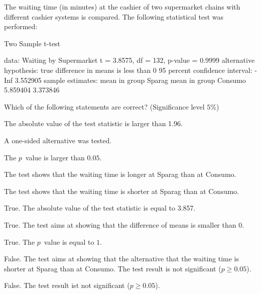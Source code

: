 
\begin{question}
The waiting time (in minutes) at the cashier of two supermarket
chains with different cashier systems is compared. The following
statistical test was performed:

\begin{Schunk}
\begin{Soutput}
	Two Sample t-test

data:  Waiting by Supermarket
t = 3.8575, df = 132, p-value = 0.9999
alternative hypothesis: true difference in means is less than 0
95 percent confidence interval:
     -Inf 3.552905
sample estimates:
 mean in group Sparag mean in group Consumo 
             5.859404              3.373846 
\end{Soutput}
\end{Schunk}

Which of the following statements are correct? (Significance level $5\%$)

\begin{answerlist}
  \item The absolute value of the test statistic is larger than 1.96.
  \item A one-sided alternative was tested.
  \item The $p$~value is larger than $0.05$.
  \item The test shows that the waiting time is longer at Sparag  than at Consumo.
  \item The test shows that the waiting time is shorter at Sparag than at Consumo.
\end{answerlist}
\end{question}

\begin{solution}
\begin{answerlist}
  \item True. The absolute value of the test statistic is equal to 3.857.
  \item True. The test aims at showing that the difference of means is  smaller than $0$.
  \item True. The $p$~value is equal to $1$.
  \item False. The test aims at showing that the alternative that the waiting time is shorter at Sparag than at Consumo. The test result is not significant ($p \ge 0.05$).
  \item False.  The test result ist not significant ($p \ge 0.05$).
\end{answerlist}
\end{solution}


